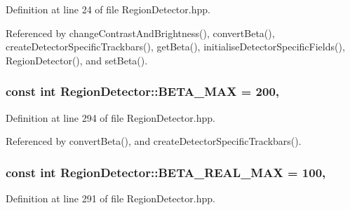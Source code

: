 Definition at line 24 of file Region\-Detector.\-hpp.



Referenced by change\-Contrast\-And\-Brightness(), convert\-Beta(), create\-Detector\-Specific\-Trackbars(), get\-Beta(), initialise\-Detector\-Specific\-Fields(), Region\-Detector(), and set\-Beta().

\hypertarget{classmultiscale_1_1analysis_1_1RegionDetector_ad2c6485f637cae5abee0303b41df1480}{
\subsubsection[{B\-E\-T\-A\-\_\-\-M\-A\-X}]{\setlength{\rightskip}{0pt plus 5cm}const int Region\-Detector\-::\-B\-E\-T\-A\-\_\-\-M\-A\-X = 200\hspace{0.3cm}{\ttfamily [static]}, {\ttfamily [private]}}}\label{classmultiscale_1_1analysis_1_1RegionDetector_ad2c6485f637cae5abee0303b41df1480}


Definition at line 294 of file Region\-Detector.\-hpp.



Referenced by convert\-Beta(), and create\-Detector\-Specific\-Trackbars().

\hypertarget{classmultiscale_1_1analysis_1_1RegionDetector_a19e9e6c3ea18fe9a3dbf7a1a02652985}{
\subsubsection[{B\-E\-T\-A\-\_\-\-R\-E\-A\-L\-\_\-\-M\-A\-X}]{\setlength{\rightskip}{0pt plus 5cm}const int Region\-Detector\-::\-B\-E\-T\-A\-\_\-\-R\-E\-A\-L\-\_\-\-M\-A\-X = 100\hspace{0.3cm}{\ttfamily [static]}, {\ttfamily [private]}}}\label{classmultiscale_1_1analysis_1_1RegionDetector_a19e9e6c3ea18fe9a3dbf7a1a02652985}


Definition at line 291 of file Region\-Detector.\-hpp.



